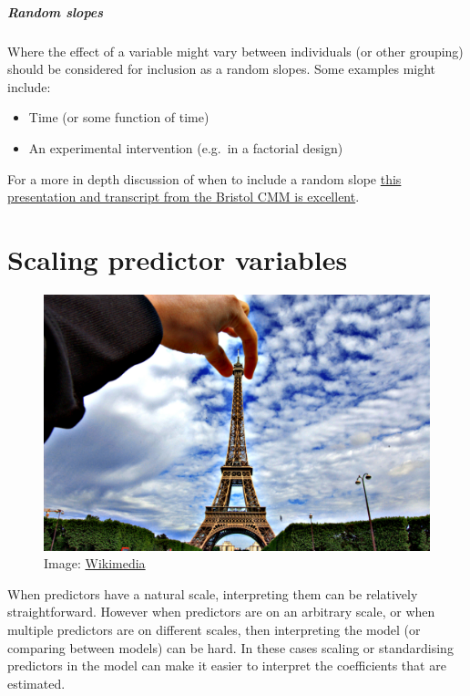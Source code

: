 \documentclass[]{article}
\providecommand{\tightlist}{%
  \setlength{\itemsep}{0pt}\setlength{\parskip}{0pt}}
\let\oldsubparagraph\subparagraph
\renewcommand{\subparagraph}[1]{\oldsubparagraph{#1}\mbox{}}
\begin{document}
\hypertarget{random-slopes}{%
\subparagraph{Random slopes}\label{random-slopes}}

Where the effect of a variable might vary between individuals (or other
grouping) should be considered for inclusion as a random slopes. Some examples
might include:

\begin{itemize}
\tightlist
\item
  Time (or some function of time)
\item
  An experimental intervention (e.g.~in a factorial design)
\end{itemize}

For a more in depth discussion of when to include a random slope
\href{http://www.bristol.ac.uk/cmm/learning/videos/random-slopes.html}{this presentation and transcript from the Bristol CMM is excellent}.

\hypertarget{scaling-predictors}{%
\section{Scaling predictor variables}\label{scaling-predictors}}

\begin{figure}
\centering
\includegraphics{media/Holding_the_eiffel_tower.jpg}
\caption{Image: \href{https://commons.wikimedia.org/wiki/File:Holding_the_eiffel_tower_(4114302348).jpg}{Wikimedia}}
\end{figure}

When predictors have a natural scale, interpreting them can be relatively
straightforward. However when predictors are on an arbitrary scale, or when
multiple predictors are on different scales, then interpreting the model (or
comparing between models) can be hard. In these cases scaling or standardising
predictors in the model can make it easier to interpret the coefficients that
are estimated.
\end{document}
